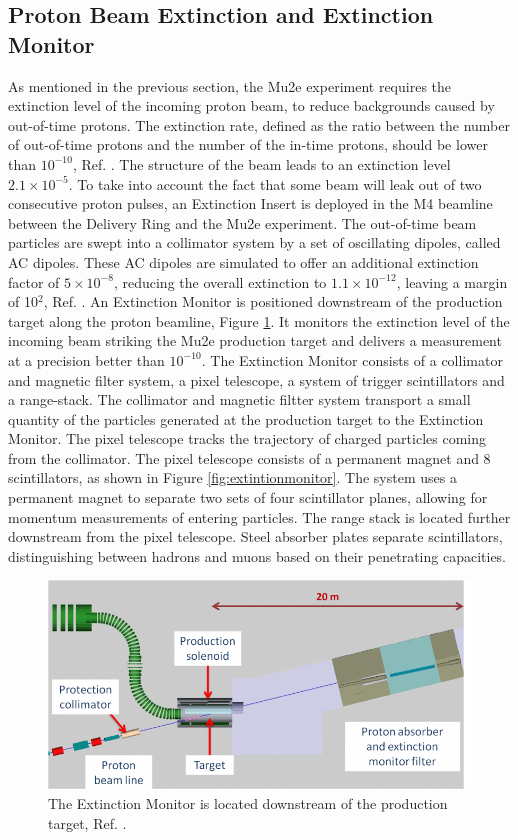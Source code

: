\subsection{Proton Beam Extinction and Extinction Monitor}
As mentioned in the previous section, the Mu2e experiment requires the extinction level of the incoming proton beam, to reduce backgrounds caused by out-of-time protons. The extinction rate, defined as the ratio between the number of out-of-time protons and the number of the in-time protons, should be lower than $10^{-10}$, Ref. \cite{bartoszek2015mu2e}. The structure of the beam leads to an extinction level $2.1 \times 10^{-5}$. To take into account the fact that some beam will leak out of two consecutive proton pulses, an Extinction Insert is deployed in the M4 beamline between the Delivery Ring and the Mu2e experiment. The out-of-time beam particles are swept into a collimator system by a set of oscillating dipoles, called AC dipoles. These AC dipoles are simulated to offer an additional extinction factor of $5\times 10^{-8}$, reducing the overall extinction to $1.1 \times 10^{-12}$, leaving a margin of 10$^2$, Ref. \cite{accelerator}. An Extinction Monitor is positioned downstream of the production target along the proton beamline, Figure \ref{fig:extintion}. It monitors the extinction level of the incoming beam striking the Mu2e production target and delivers a measurement at a precision better than $10^{-10}$. The Extinction Monitor consists of a collimator and magnetic filter system, a pixel telescope, a system of trigger scintillators and a range-stack. The collimator and magnetic filtter system transport a small quantity of the particles generated at the production target to the Extinction Monitor. The pixel telescope tracks the trajectory of charged particles coming from the collimator. The pixel telescope consists of a permanent magnet and 8 scintillators, as shown in Figure \ref{fig:extintionmonitor}. The system uses a permanent magnet to separate two sets of four scintillator planes, allowing for momentum measurements of entering particles. The range stack is located further downstream from the pixel telescope. Steel absorber plates separate scintillators, distinguishing between hadrons and muons based on their penetrating capacities.
\begin{figure}[!h]
\centering
\includegraphics[width =\textwidth]{images/chapter2/800px-Extinction_filter.png}
\caption{The Extinction Monitor is located downstream of the
production target, Ref. \cite{Prebys:IPAC2015-THPF121}.}
\label{fig:extintion}
\end{figure}
